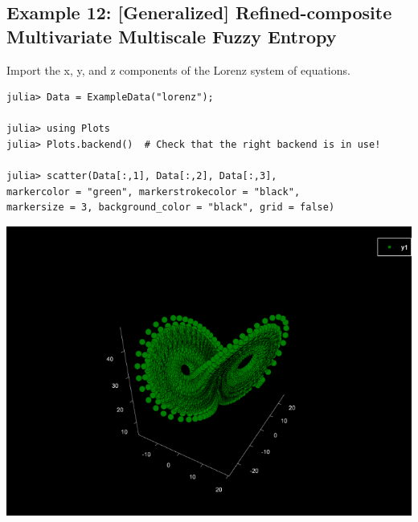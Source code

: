 \documentclass[12pt, a4paper, titlepage, openany]{book}
\begin{document}
\subsection{\normalsize Example 12: \hspace{15mm} [Generalized] Refined-composite Multivariate Multiscale Fuzzy Entropy}
\noindent Import the x, y, and z components of the Lorenz system of equations.
\begin{verbatim}
julia> Data = ExampleData("lorenz");

julia> using Plots
julia> Plots.backend()  # Check that the right backend is in use! 

julia> scatter(Data[:,1], Data[:,2], Data[:,3], 
markercolor = "green", markerstrokecolor = "black",
markersize = 3, background_color = "black", grid = false)
\end{verbatim}
\includegraphics[scale=.5]{lorenzjl.png}\newline 
\end{document}
